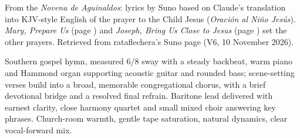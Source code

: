 
\label{sec:by-the-grace-of-your-holy}
\begin{notes}
From the \emph{Novena de Aguinaldos}: lyrics by Suno based on Claude's translation into KJV-style English of the prayer to the Child Jesus (\emph{Oración al Niño Jesús}). \emph{Mary, Prepare Us} (page \pageref{sec:mary-prepare-us}) and \emph{Joseph, Bring Us Close to Jesus} (page \pageref{sec:joseph-bring-us-close-to-jesus}) set the other prayers. Retrieved from rataflechera's Suno page (V6, 10 November 2026).
\end{notes}
\begin{style}
Southern gospel hymn, measured 6/8 sway with a steady backbeat, warm piano and Hammond organ supporting acoustic guitar and rounded bass; scene-setting verses build into a broad, memorable congregational chorus, with a brief devotional bridge and a resolved final refrain. Baritone lead delivered with earnest clarity, close harmony quartet and small mixed choir answering key phrases. Church-room warmth, gentle tape saturation, natural dynamics, clear vocal-forward mix.
\end{style}
